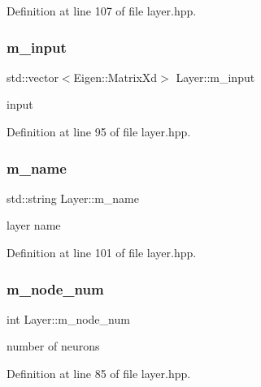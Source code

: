 Definition at line 107 of file layer.\+hpp.

\mbox{\label{class_layer_a539fe2109359315ffeee30a865c32606}} 
\subsubsection{\texorpdfstring{m\+\_\+input}{m\_input}}
{\footnotesize\ttfamily std\+::vector$<$Eigen\+::\+Matrix\+Xd$>$ Layer\+::m\+\_\+input\hspace{0.3cm}{\ttfamily [protected]}}



input 



Definition at line 95 of file layer.\+hpp.

\mbox{\label{class_layer_a2b075c64ebffde8730a248a5bb5f5133}} 
\subsubsection{\texorpdfstring{m\+\_\+name}{m\_name}}
{\footnotesize\ttfamily std\+::string Layer\+::m\+\_\+name\hspace{0.3cm}{\ttfamily [protected]}}



layer name 



Definition at line 101 of file layer.\+hpp.

\mbox{\label{class_layer_a59c691d45358bedfe3d0dbc4b1cf4265}} 
\subsubsection{\texorpdfstring{m\+\_\+node\+\_\+num}{m\_node\_num}}
{\footnotesize\ttfamily int Layer\+::m\+\_\+node\+\_\+num\hspace{0.3cm}{\ttfamily [protected]}}



number of neurons 



Definition at line 85 of file layer.\+hpp.

